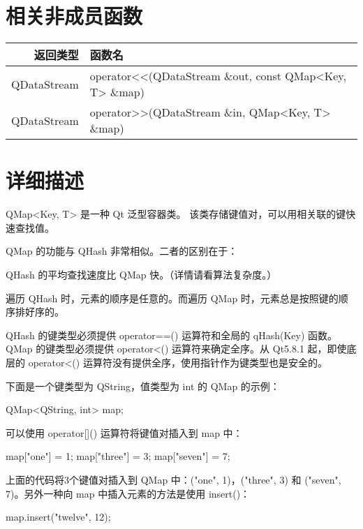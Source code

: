 \section{相关非成员函数}

\begin{longtable}[l]{|r|l|}
\hline
返回类型  & 	函数名 \\
\hline
QDataStream &	operator<<(QDataStream \&out, const QMap<Key, T> \&map) \\ 
\hline
QDataStream &	operator>>(QDataStream \&in, QMap<Key, T> \&map) \\  
\hline
\end{longtable}

\section{详细描述}

QMap<Key, T> 是一种 Qt 泛型容器类。
该类存储键值对，可以用相关联的键快速查找值。

QMap 的功能与 QHash 非常相似。二者的区别在于：

\begin{compactitem}
\item QHash 的平均查找速度比 QMap 快。（详情请看算法复杂度。）
\item 遍历 QHash 时，元素的顺序是任意的。而遍历 QMap 时，元素总是按照键的顺序排好序的。
\item QHash 的键类型必须提供 operator==() 运算符和全局的 qHash(Key) 函数。QMap 的键类型必须提供 operator<() 运算符来确定全序。从 Qt5.8.1 起，即使底层的 operator<() 运算符没有提供全序，使用指针作为键类型也是安全的。
\end{compactitem}

下面是一个键类型为 QString，值类型为 int 的 QMap 的示例：

\begin{cppcode}
QMap<QString, int> map;
\end{cppcode}

可以使用 operator[]() 运算符将键值对插入到 map 中：

\begin{cppcode}
map["one"] = 1;
map["three"] = 3;
map["seven"] = 7;
\end{cppcode}


上面的代码将3个键值对插入到 QMap 中：("one", 1)，("three", 3) 和 ("seven", 7)。另外一种向 map 中插入元素的方法是使用 insert()：

\begin{cppcode}
map.insert("twelve", 12);
\end{cppcode}

